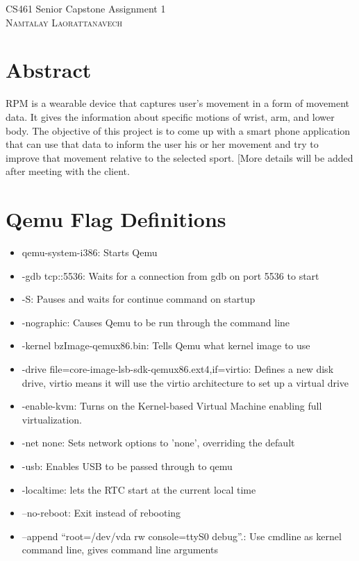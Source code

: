 \documentclass[letterpaper,10pt]{article}
\begin{document}
\begin{titlepage}
   \centering
   \vspace*{\baselineskip}
   {\LARGE CS461 Senior Capstone Assignment 1 }
   \vspace{2\baselineskip}
   {\scshape\Large \\ Namtalay Laorattanavech  \\}
   \vspace{2\baselineskip}
   
  
\end{titlepage}

\section*{Abstract}

RPM is a wearable device that captures user’s movement in a form of movement data. It gives the information about specific motions of wrist, arm, and lower body. The objective of this project is to come up with a smart phone application that can use that data to inform the user his or her movement and try to improve that movement relative to the selected sport. [More details will be added after meeting with the client.\\

\section*{Qemu Flag Definitions}

\begin{itemize}
\item qemu-system-i386: Starts Qemu
\item -gdb tcp::5536: Waits for a connection from gdb on port 5536 to start
\item -S: Pauses and waits for continue command on startup
\item -nographic: Causes Qemu to be run through the command line
\item -kernel bzImage-qemux86.bin: Tells Qemu what kernel image to use
\item -drive file=core-image-lsb-sdk-qemux86.ext4,if=virtio: Defines a new disk drive, virtio means it will use the virtio architecture to set up a virtual drive
\item -enable-kvm: Turns on the Kernel-based Virtual Machine enabling full virtualization.
\item -net none: Sets network options to ’none’, overriding the default
\item -usb: Enables USB to be passed through to qemu
\item -localtime: lets the RTC start at the current local time
\item –no-reboot: Exit instead of rebooting
\item –append “root=/dev/vda rw console=ttyS0 debug”.: Use cmdline as kernel command line, gives command line arguments
\end{itemize}
\newpage
\end{document}
